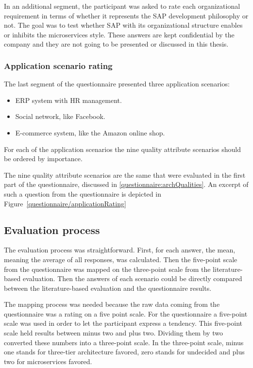 In an additional segment, the participant was asked to rate each organizational requirement in terms of whether it represents the SAP development philosophy or not.
The goal was to test whether SAP with its organizational structure enables or inhibits the microservices style.
These answers are kept confidential by the company and they are not going to be presented or discussed in this thesis.

\subsubsection{Application scenario rating}
\label{questionnaire:appScenario}
The last segment of the questionnaire presented three application scenarios:
\begin{itemize}
\item ERP system with HR management.
\item Social network, like Facebook.
\item E-commerce system, like the Amazon online shop.
\end{itemize}
For each of the application scenarios the nine quality attribute scenarios should be ordered by importance.

The nine quality attribute scenarios are the same that were evaluated in the first part of the questionnaire, discussed in  \ref{questionnaire:archQualities}.
An excerpt of such a question from the questionnaire is depicted in Figure~\ref{questionnaire/applicationRating}

\subsection{Evaluation process}
\label{que:evalProcess}
The evaluation process was straightforward.
First, for each answer, the mean, meaning the average of all responses, was calculated.
Then the five-point scale from the questionnaire was mapped on the three-point scale from the literature-based evaluation.
Then the answers of each scenario could be directly compared between the literature-based evaluation and the questionnaire results.

The mapping process was needed because the raw data coming from the questionnaire was a rating on a five point scale.
For the questionnaire a five-point scale was used in order to let the participant express a tendency.
This five-point scale held results between minus two and plus two.
Dividing them by two converted these numbers into a three-point scale.
In the three-point scale, minus one stands for three-tier architecture favored, zero stands for undecided and plus two for microservices favored.

